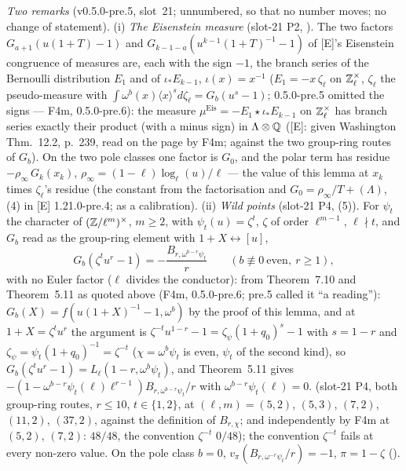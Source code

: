 \documentclass[11pt]{article}
\newcommand{\Iw}{\Lambda}                         %
\newcommand{\Zl}{\Z_\ell}
\begin{document}
\noindent\emph{Two remarks} (v0.5.0-pre.5, slot~21; unnumbered, so that no number moves; no change of statement). (i) \emph{The Eisenstein measure} (slot-21 P2, ).
The two factors $G_{a+1}(u(1+T)-1)$ and $G_{k-1-a}(u^{k-1}(1+T)^{-1}-1)$ of [E]'s Eisenstein congruence of measures are, each with the sign $-1$, the branch series of the Bernoulli
distribution $E_1$ and of $\iota_\ast E_{k-1}$, $\iota(x)=x^{-1}$ ($E_1=-x\,\zeta_\ell$ on $\Zl^{\times}$, $\zeta_\ell$ the pseudo-measure with $\int\omega^{b}(x)\langle x\rangle^{s}d\zeta_\ell=G_b(u^{s}-1)$;
0.5.0-pre.5 omitted the signs --- F4m, 0.5.0-pre.6): the measure $\mu^{\mathrm{Eis}}=-E_1\star\iota_\ast E_{k-1}$ on $\Zl^{\times}$ has branch series exactly their product (with a minus sign) in $\Iw\otimes\Q$ ([E]:
\PROVED{} given Washington Thm.~12.2, p.~239, read on the page by F4m; \COMP{} against the two group-ring routes of $G_b$). On the two pole classes one factor is $G_0$, and the polar term has residue
$-\rho_\infty\,G_k(x_k)$, $\rho_\infty=(1-\ell)\log_\ell(u)/\ell$ --- the value of this lemma at $x_k$ times $\zeta_\ell$'s residue (the constant \PROVED{} from the factorisation and $G_0=\rho_\infty/T+(\Iw)$, (4) in [E] 1.21.0-pre.4; \COMP{} as a calibration). (ii) \emph{Wild points} (slot-21 P4,
(5)). For $\psi_t$ the character of $(\mathbb{Z}/\ell^{m})^{\times}$, $m\ge2$, with $\psi_t(u)=\zeta^{t}$, $\zeta$ of order $\ell^{m-1}$, $\ell\nmid t$, and $G_b$ read as the
group-ring element with $1+X\leftrightarrow[u]$,
\[
  G_b(\zeta^{t}u^{r}-1)=-\frac{B_{r,\omega^{b-r}\psi_t}}{r}\qquad(b\not\equiv0\ \text{even},\ r\ge1),
\]
with no Euler factor ($\ell$ divides the conductor): \PROVED{} from Theorem~7.10 and Theorem~5.11 as quoted above (F4m, 0.5.0-pre.6; pre.5 called it ``a reading''): $G_b(X)=f(u(1+X)^{-1}-1,\omega^{b})$
by the proof of this lemma, and at $1+X=\zeta^{t}u^{r}$ the argument is $\zeta^{-t}u^{1-r}-1=\zeta_\psi(1+q_0)^{s}-1$ with $s=1-r$ and $\zeta_\psi=\psi_t(1+q_0)^{-1}=\zeta^{-t}$ ($\chi=\omega^{b}\psi_t$ is
even, $\psi_t$ of the second kind), so $G_b(\zeta^{t}u^{r}-1)=L_\ell(1-r,\omega^{b}\psi_t)$, and Theorem~5.11 gives $-(1-\omega^{b-r}\psi_t(\ell)\ell^{r-1})B_{r,\omega^{b-r}\psi_t}/r$ with
$\omega^{b-r}\psi_t(\ell)=0$. \COMP{} (slot-21 P4, both group-ring routes, $r\le10$, $t\in\{1,2\}$, at $(\ell,m)=(5,2)$, $(5,3)$, $(7,2)$, $(11,2)$, $(37,2)$, against the
definition of $B_{r,\chi}$; and independently by F4m at $(5,2)$, $(7,2)$: $48/48$, the convention $\zeta^{-t}$ $0/48$); the convention $\zeta^{-t}$ fails at every non-zero value. On the pole class $b=0$, $v_\pi(B_{r,\omega^{-r}\psi_t}/r)=-1$, $\pi=1-\zeta$ (\COMP).
\end{document}
